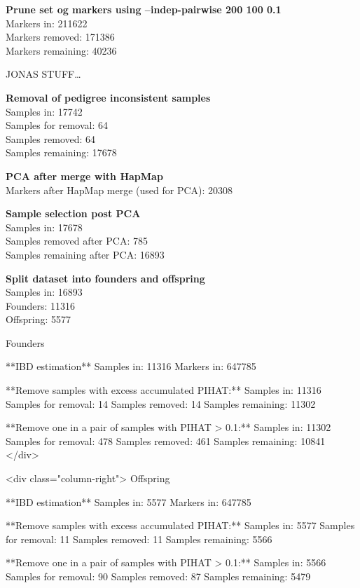 \documentclass[]{article}
\begin{document}
\textbf{Prune set og markers using --indep-pairwise 200 100 0.1}\\
Markers in: 211622\\
Markers removed: 171386\\
Markers remaining: 40236

JONAS STUFF\ldots{}

\textbf{Removal of pedigree inconsistent samples}\\
Samples in: 17742\\
Samples for removal: 64\\
Samples removed: 64\\
Samples remaining: 17678

\textbf{PCA after merge with HapMap}\\
Markers after HapMap merge (used for PCA): 20308

\textbf{Sample selection post PCA}\\
Samples in: 17678\\
Samples removed after PCA: 785\\
Samples remaining after PCA: 16893

\textbf{Split dataset into founders and offspring}\\
Samples in: 16893\\
Founders: 11316\\
Offspring: 5577

\begin{multicols}{2}

Founders

**IBD estimation**  
Samples in: 11316  
Markers in: 647785

**Remove samples with excess accumulated PIHAT:**   
Samples in: 11316  
Samples for removal: 14  
Samples removed: 14  
Samples remaining: 11302  

**Remove one in a pair of samples with PIHAT > 0.1:**  
Samples in: 11302  
Samples for removal: 478  
Samples removed: 461  
Samples remaining: 10841
\columnbreak
</div>


<div class="column-right">
Offspring

**IBD estimation**  
Samples in: 5577  
Markers in: 647785

**Remove samples with excess accumulated PIHAT:**   
Samples in: 5577  
Samples for removal: 11  
Samples removed: 11  
Samples remaining: 5566  

**Remove one in a pair of samples with PIHAT > 0.1:**  
Samples in: 5566  
Samples for removal: 90  
Samples removed: 87  
Samples remaining: 5479
\end{multicols}
\end{document}
